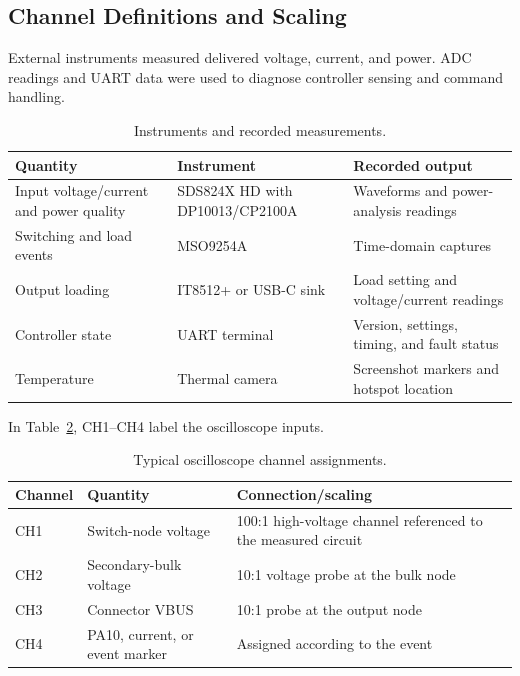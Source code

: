 \subsection{Channel Definitions and Scaling}
\label{sec:method-instruments}

External instruments measured delivered voltage, current, and power.
ADC readings and UART data were used to diagnose controller sensing and
command handling.

\begin{table}[htbp]
\centering
\caption{Instruments and recorded measurements.}
\label{tab:instrument-role-map}
\begin{tabularx}{\textwidth}{@{}p{}p{}X@{}}
\toprule
Quantity & Instrument & Recorded output\\
\midrule
Input voltage/current and power quality & SDS824X HD with DP10013/CP2100A & Waveforms and power-analysis readings\\
Switching and load events & MSO9254A & Time-domain captures\\
Output loading & IT8512+ or USB-C sink & Load setting and voltage/current readings\\
Controller state & UART terminal & Version, settings, timing, and fault status\\
Temperature & Thermal camera & Screenshot markers and hotspot location\\
\bottomrule
\end{tabularx}
\end{table}

In Table~\ref{tab:channel-definitions}, CH1--CH4 label the oscilloscope inputs.

\begin{table}[htbp]
\centering
\caption{Typical oscilloscope channel assignments.}
\label{tab:channel-definitions}
\begin{tabularx}{\textwidth}{@{}p{}p{}X@{}}
\toprule
Channel & Quantity & Connection/scaling\\
\midrule
CH1 & Switch-node voltage & 100:1 high-voltage channel referenced to the measured circuit\\
CH2 & Secondary-bulk voltage & 10:1 voltage probe at the bulk node\\
CH3 & Connector VBUS & 10:1 probe at the output node\\
CH4 & PA10, current, or event marker & Assigned according to the event\\
\bottomrule
\end{tabularx}
\end{table}


